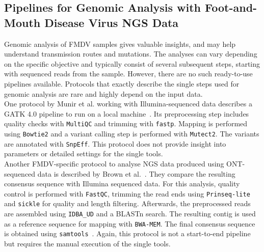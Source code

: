 \subsection{Pipelines for Genomic Analysis with Foot-and-Mouth Disease Virus NGS Data}
Genomic analysis of \ac{FMDV} samples gives valuable insights, and may help understand transmission routes and mutations. The analyses can vary depending on the specific objective and typically consist of several subsequent steps, starting with sequenced reads from the sample. However, there are no such ready-to-use pipelines available. Protocols that exactly describe the single steps used for genomic analysis are rare and highly depend on the input data. \\
One protocol by Munir et al. working with Illumina-sequenced data describes a \ac{GATK} 4.0 pipeline to run on a local machine~\cite{munir2022whole}. Its preprocessing step includes quality checks with \texttt{MultiQC} and trimming with \texttt{fastp}. Mapping is performed using \texttt{Bowtie2} and a variant calling step is performed with \texttt{Mutect2}. The variants are annotated with \texttt{SnpEff}. This protocol does not provide insight into parameters or detailed settings for the single tools. \\
Another \ac{FMDV}-specific protocol to analyse \ac{NGS} data produced using \ac{ONT}-sequenced data is described by Brown et al.~\cite{brown2021characterising}. They compare the resulting consensus sequence with Illumina sequenced data. For this analysis, quality control is performed with \texttt{FastQC}, trimming the read ends using \texttt{Prinseq-lite} and \texttt{sickle} for quality and length filtering. Afterwards, the preprocessed reads are assembled using \texttt{IDBA\_UD} and a \ac{BLAST}n search. The resulting contig is used as a reference sequence for mapping with \texttt{BWA-MEM}. The final consensus sequence is obtained using \texttt{samtools}~\cite{brown2021characterising}. Again, this protocol is not a start-to-end pipeline but requires the manual execution of the single tools.
